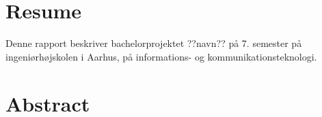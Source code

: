 \thispagestyle{fancy}
\section*{Resume}
\label{sec:resume}
Denne rapport beskriver bachelorprojektet  ??navn?? på 7. semester på ingeniørhøjskolen i Aarhus, på informations- og kommunikationsteknologi. 

\section*{Abstract}
\label{sec:abstract}